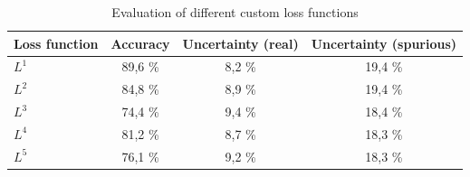 \documentclass[11pt,twoside,a4paper]{article}
\begin{document}
\begin{table}[!b]
  \begin{adjustwidth}{-.5in}{-.5in}
  \begin{center}
    \begin{tabular}{l | c | c | c}
      Loss function	& Accuracy	& Uncertainty (real)	& Uncertainty (spurious) \\
      \hline
      \(L^1\)		& 89,6 \%		& 8,2  \% 			& 19,4 \% \\      
      \(L^2\)		& 84,8 \%		& 8,9 \% 			& 19,4 \% \\      
      \(L^3\)		& 74,4 \%		& 9,4 \% 			& 18,4 \% \\      
      \(L^4\)		& 81,2 \%		& 8,7 \% 			& 18,3 \% \\      
      \(L^5\)		& 76,1 \%		& 9,2 \% 			& 18,3 \% \\      
    \end{tabular}
    \caption{Evaluation of different custom loss functions}
    \label{tab:custom}
  \end{center}
  \end{adjustwidth}
\end{table}
\end{document}
